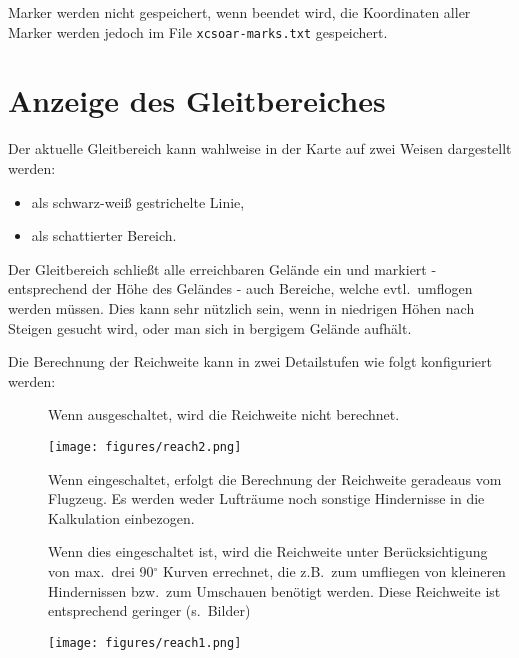 Marker werden nicht gespeichert, wenn \xc beendet wird, die Koordinaten aller Marker werden jedoch im File \verb|xcsoar-marks.txt| gespeichert.

\section{Anzeige des Gleitbereiches}\label{sec:reach}

Der aktuelle Gleitbereich kann wahlweise in der Karte auf zwei Weisen dargestellt werden:
\begin{itemize}
    \item als schwarz-weiß gestrichelte Linie, 
    \item als schattierter Bereich.
\end{itemize}
Der Gleitbereich schließt alle erreichbaren Gelände ein und markiert - entsprechend der Höhe des Geländes - auch Bereiche, welche evtl.\ umflogen werden müssen.  Dies kann sehr nützlich sein, wenn in niedrigen Höhen nach Steigen gesucht wird, oder man sich in bergigem Gelände aufhält.

Die Berechnung der Reichweite  kann in zwei Detailstufen  wie folgt konfiguriert werden:

\begin{description}
\item[] Wenn ausgeschaltet, wird die Reichweite nicht berechnet.
\begin{center}
\texttt{[image: figures/reach2.png]}
\end{center}
\item[] Wenn eingeschaltet, erfolgt die Berechnung der Reichweite geradeaus vom Flugzeug. Es werden weder Lufträume noch sonstige Hindernisse in die Kalkulation einbezogen.
 \item[] Wenn dies eingeschaltet ist, wird die Reichweite unter Berücksichtigung von max.\ drei 90$^\circ$ Kurven errechnet, die z.B.\ zum umfliegen von kleineren Hindernissen bzw.\ zum Umschauen benötigt werden. Diese Reichweite ist entsprechend geringer (s.\ Bilder)
\begin{center}
\texttt{[image: figures/reach1.png]}
\end{center}
\end{description}

